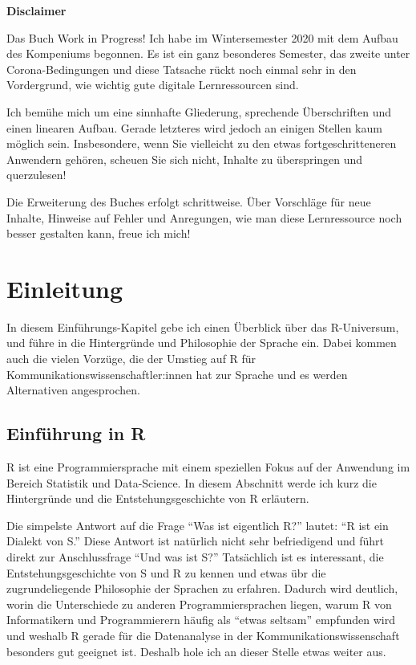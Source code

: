 \documentclass[
]{book}
\begin{document}
\textbf{Disclaimer}

Das Buch Work in Progress! Ich habe im Wintersemester 2020 mit dem Aufbau des Kompeniums begonnen. Es ist ein ganz besonderes Semester, das zweite unter Corona-Bedingungen und diese Tatsache rückt noch einmal sehr in den Vordergrund, wie wichtig gute digitale Lernressourcen sind.

Ich bemühe mich um eine sinnhafte Gliederung, sprechende Überschriften und einen linearen Aufbau. Gerade letzteres wird jedoch an einigen Stellen kaum möglich sein. Insbesondere, wenn Sie vielleicht zu den etwas fortgeschritteneren Anwendern gehören, scheuen Sie sich nicht, Inhalte zu überspringen und querzulesen!

Die Erweiterung des Buches erfolgt schrittweise. Über Vorschläge für neue Inhalte, Hinweise auf Fehler und Anregungen, wie man diese Lernressource noch besser gestalten kann, freue ich mich!

\hypertarget{intro}{%
\chapter{Einleitung}\label{intro}}

In diesem Einführungs-Kapitel gebe ich einen Überblick über das R-Universum, und führe in die Hintergründe und Philosophie der Sprache ein. Dabei kommen auch die vielen Vorzüge, die der Umstieg auf R für Kommunikationswissenschaftler:innen hat zur Sprache und es werden Alternativen angesprochen.

\hypertarget{einfuxfchrung-in-r}{%
\section{Einführung in R}\label{einfuxfchrung-in-r}}

R ist eine Programmiersprache mit einem speziellen Fokus auf der Anwendung im Bereich Statistik und Data-Science. In diesem Abschnitt werde ich kurz die Hintergründe und die Entstehungsgeschichte von R erläutern.

Die simpelste Antwort auf die Frage ``Was ist eigentlich R?'' lautet: ``R ist ein Dialekt von S.'' \citep{Peng_2020}
Diese Antwort ist natürlich nicht sehr befriedigend und führt direkt zur Anschlussfrage
``Und was ist S?'' Tatsächlich ist es interessant, die Entstehungsgeschichte von S und R zu kennen und etwas übr die zugrundeliegende Philosophie der Sprachen zu erfahren.
Dadurch wird deutlich, worin die Unterschiede zu anderen Programmiersprachen liegen, warum
R von Informatikern und Programmierern häufig als ``etwas seltsam'' empfunden wird und weshalb R gerade
für die Datenanalyse in der Kommunikationswissenschaft besonders gut geeignet ist.
Deshalb hole ich an dieser Stelle etwas weiter aus.
\end{document}
